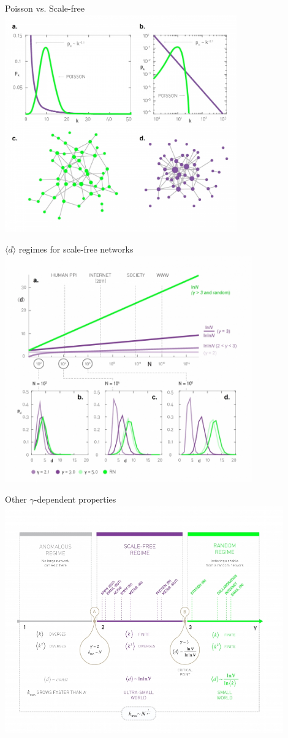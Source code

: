 \documentclass{beamer}
\begin{document}
\begin{frame}{Poisson vs. Scale-free}
  \vspace{-1em}
  \centering
  \includegraphics[width=0.75\textwidth]{Figures/poissonVsScalefree.jpg}
\end{frame}


\begin{frame}{$\langle d \rangle$ regimes for scale-free networks}
  \vspace{-1em}
  \centering
  \includegraphics[width=0.8\textwidth]{Figures/scaleFreeDistances.jpg}
\end{frame}

\begin{frame}{Other $\gamma$-dependent properties}
  \vspace{-1em}
  \centering
  \includegraphics[width=0.9\textwidth]{Figures/gammaDependentPropBox.jpg}
\end{frame}
\end{document}
